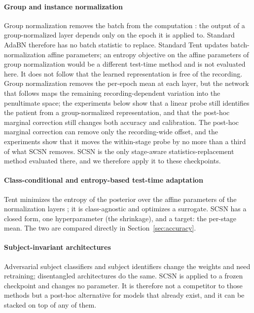 \paragraph{Group and instance normalization}
Group normalization removes the batch from the computation
\citep{wu2018group}: the output of a group-normalized layer depends only on
the epoch it is applied to. Standard AdaBN therefore has no batch statistic to
replace. Standard Tent updates batch-normalization affine parameters; an
entropy objective on the affine parameters of group normalization would be a
different test-time method and is not evaluated here. It does not follow that
the learned representation is free of the recording. Group normalization
removes the per-epoch mean at each layer, but the network that follows maps
the remaining recording-dependent variation into the penultimate space; the
experiments below show that a linear probe still identifies the patient from
a group-normalized representation, and that the post-hoc marginal correction
still changes both accuracy and calibration. The post-hoc marginal correction
can remove only the recording-wide offset, and the experiments show that it
moves the within-stage probe by no more than a third of what SCSN removes.
SCSN is the only stage-aware statistics-replacement method evaluated there,
and we therefore apply it to these checkpoints.

\paragraph{Class-conditional and entropy-based test-time adaptation}
Tent minimizes the entropy of the posterior over the affine parameters of the
normalization layers \citep{wang2021tent}; it is class-agnostic and optimizes a
surrogate. SCSN has a closed form, one hyperparameter (the shrinkage), and a
target: the per-stage mean. The two are compared directly in
Section~\ref{sec:accuracy}.

\paragraph{Subject-invariant architectures}
Adversarial subject classifiers and subject identifiers
\citep{liao2020trifeaturenet,phan2022sleepformer} change the weights and need
retraining; disentangled architectures \citep{perslev2021} do the same. SCSN
is applied to a frozen checkpoint and changes no parameter. It is therefore
not a competitor to those methods but a post-hoc alternative for models that
already exist, and it can be stacked on top of any of them.
